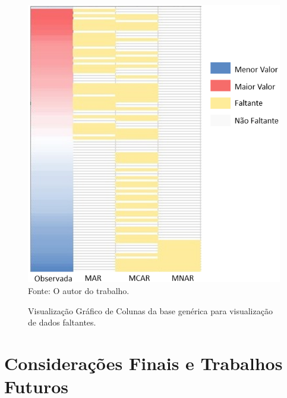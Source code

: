 \documentclass[
	12pt,				%
	openright,			%
	oneside,			%
	a4paper,			%
	english,			%
	brazil				%
	]{abntex2}
\begin{document}
	\begin{figure}[h!]
		\centering
		\caption{Visualização Gráfico de Colunas da base genérica para visualização de dados faltantes.}
		\includegraphics[width=\linewidth]{./figures/Resultados/MVMatrixPlot.png}
		\label{fig:MVMatrixPlot}
		\footnotesize Fonte: O autor do trabalho.
	\end{figure}
	

\chapter{Considerações Finais e Trabalhos Futuros}
\end{document}
